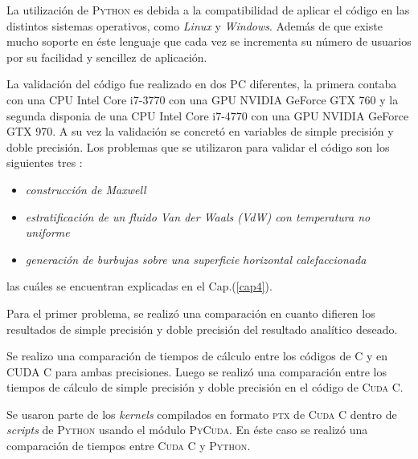 La utilización de \textsc{Python} es debida a la compatibilidad de aplicar  el código en las distintos sistemas operativos, como \textit{Linux} y \textit{Windows}. Además de que existe mucho soporte en éste lenguaje que cada vez se incrementa su número de usuarios por su facilidad y sencillez de aplicación.


La validación del código fue realizado en dos PC diferentes, la primera contaba con una CPU Intel Core i7-3770 con una GPU NVIDIA GeForce GTX 760 y la segunda disponia de una CPU Intel Core i7-4770 con una GPU NVIDIA GeForce GTX 970. A su vez la validación se concretó en variables de simple precisión y doble precisión. Los problemas que se utilizaron para validar el código son los siguientes tres :

\begin{itemize}
	\item \textit{construcción de Maxwell}
	\item \textit{estratificación de un fluido Van der Waals (VdW) con temperatura no uniforme}
	\item \textit{generación de burbujas sobre una superficie horizontal calefaccionada}
\end{itemize} 

las cuáles se encuentran explicadas en el Cap.(\ref{cap4}).

Para el primer problema, se realizó una comparación en cuanto difieren los resultados de simple precisión y doble precisión del resultado analítico deseado. 

Se realizo una comparación de tiempos de cálculo entre los códigos de \textsc{C} y en \textsc{CUDA C} para ambas precisiones. Luego se realizó una comparación entre los tiempos de cálculo de simple precisión y doble precisión en el código de \textsc{Cuda C}.

Se usaron parte de los \textit{kernels} compilados en formato \textsc{ptx} de \textsc{Cuda C} dentro de \textit{scripts} de \textsc{Python} usando el módulo \textsc{PyCuda}. En éste caso se realizó una comparación de tiempos entre \textsc{Cuda C} y \textsc{Python}.


